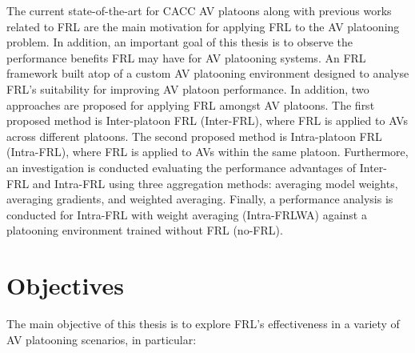 The current state-of-the-art for CACC AV platoons along with previous
works related to FRL are the main motivation for applying FRL to the AV platooning problem. In addition,
an important goal of this thesis is to observe the performance
benefits FRL may have for AV platooning systems.  An FRL framework built atop of a custom AV
platooning environment designed to analyse FRL's suitability for improving AV platoon performance.
In addition, two approaches are proposed for applying FRL amongst AV platoons. The first proposed
method is Inter-platoon FRL (Inter-FRL), where FRL is applied to AVs across different platoons.
The second proposed method is Intra-platoon FRL (Intra-FRL), where FRL is applied to AVs
within the same platoon.  Furthermore, an investigation is conducted evaluating the performance advantages of
Inter-FRL and Intra-FRL using three aggregation methods: averaging model weights,
averaging gradients, and weighted averaging.  Finally, a performance analysis is conducted for
Intra-FRL with weight averaging (Intra-FRLWA) against a platooning environment trained
without FRL (no-FRL).

\section{Objectives}
The main objective of this thesis is to explore FRL's effectiveness in a variety of AV
platooning scenarios, in particular:

